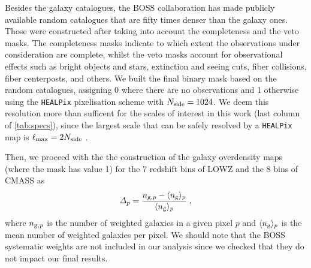\documentclass[astrosymb,twocolumn]{aastex631}
\begin{document}
Besides the galaxy catalogues, the BOSS collaboration has made publicly available random catalogues that are fifty times denser than the galaxy ones. Those were constructed after taking into account the completeness and the veto masks. The completeness masks indicate to which extent the observations under consideration are complete, whilst the veto masks account for observational effects such as bright objects and stars, extinction and seeing cuts, fiber collisions, fiber centerposts, and others. We built the final binary mask based on the random catalogues, assigning 0 where there are no observations and 1 otherwise using the \texttt{HEALPix} pixelisation scheme \citep{Gorski_2005} with \(N_{\rm side}=1024\). We deem this resolution more than sufficent for the scales of interest in this work (last column of \autoref{tab:specs}), since the largest scale that can be safely resolved by a \texttt{HEALPix} map is \(\ell_{\rm max}=2N_{\rm side}\) \citep{Ando2017}.

Then, we proceed with the the construction of the galaxy overdensity maps (where the mask has value 1) for the 7 redshift bins of LOWZ and the 8 bins of CMASS as
\begin{equation}
    \varDelta_p = \frac{n_{{\rm g},p}-\langle n_{\rm g}\rangle_p}{\langle n_{\rm g}\rangle_p}\;,
    \label{eq:overdensity}
\end{equation}
where \(n_{{\rm g},p}\) is the number of weighted galaxies in a given pixel \(p\) and \(\langle n_{\rm g}\rangle_p\) is the mean number of weighted galaxies per pixel. We should note that the BOSS systematic weights \citep{Reid2016} are not included in our analysis since we checked that they do not impact our final results.
\end{document}

